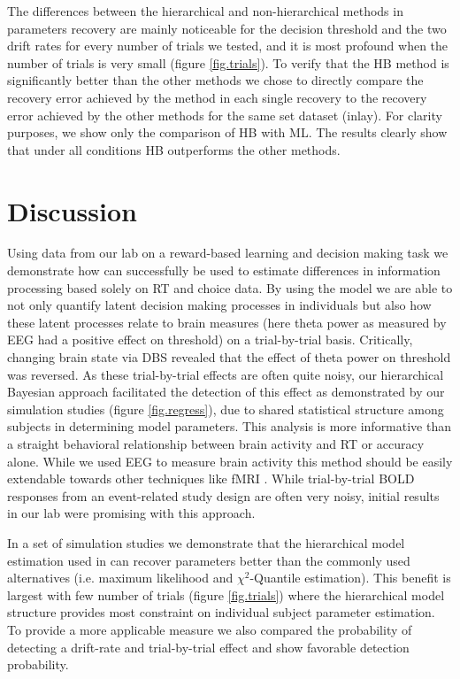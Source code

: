\documentclass[letterpaper,10pt,english]{article}
\begin{document}
The differences between the hierarchical and non-hierarchical methods in parameters recovery are mainly noticeable for the decision threshold and the two drift rates for every number of trials we tested, and it is most profound when the number of trials is very small (figure \ref{fig.trials}). To verify that the HB method is significantly better than the other methods we chose to directly compare the recovery error achieved by the method in each single recovery to the recovery error achieved by the other methods for the same set dataset (inlay). For clarity purposes, we show only the comparison of HB with ML. The results clearly show that under all conditions HB outperforms the other methods.

\section*{Discussion}
Using data from our lab on a reward-based learning and decision making
task \citep{CavanaghWieckiCohenEtAl11} we demonstrate how 
can successfully be used to estimate differences in information
processing based solely on RT and choice data. By using the
 model we are able to not only quantify latent
decision making processes in individuals but also how these latent
processes relate to brain measures (here theta power as measured by
EEG had a positive effect on threshold) on a trial-by-trial basis.
Critically, changing brain state via DBS revealed that the effect of
theta power on threshold was reversed. As these trial-by-trial effects
are often quite noisy, our hierarchical Bayesian approach facilitated
the detection of this effect as demonstrated by our simulation studies (figure \ref{fig.regress}), due to shared statistical structure
among subjects in determining model parameters. This analysis is more
informative than a straight behavioral relationship between brain
activity and RT or accuracy alone. While we used EEG to measure brain
activity this method should be easily extendable towards other
techniques like fMRI \citep[e.g.][]{ManenBrownEicheleEtAl11}. While
trial-by-trial BOLD responses from an event-related study design are
often very noisy, initial results in our lab were promising with this
approach.

In a set of simulation studies we demonstrate that the hierarchical
model estimation used in  can recover parameters better
than the commonly used alternatives (i.e. maximum likelihood and
$\chi^2$-Quantile estimation). This benefit is largest with few number
of trials (figure \ref{fig.trials}) where the hierarchical model
structure provides most constraint on individual subject parameter
estimation. To provide a more applicable measure we also compared the
probability of detecting a drift-rate and trial-by-trial effect and
show favorable detection probability.
\end{document}
